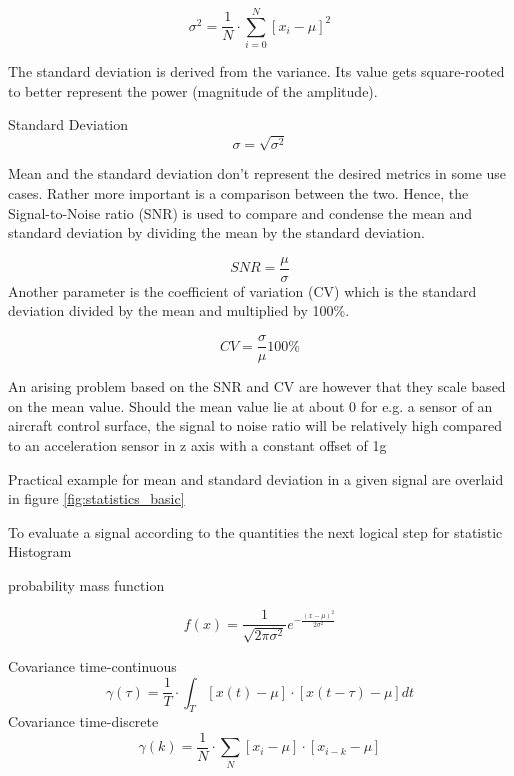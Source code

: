 \begin{equation}
    \label{eq:var_disc}
    \sigma^2=\frac{1}{N} \cdot \sum_{i=0}^{N}\left[x_i-\mu\right]^2
\end{equation}

The standard deviation is derived from the variance. Its value gets square-rooted to better represent the power (magnitude of the amplitude).

Standard Deviation
\begin{equation}
    \label{eq:stdev_disc}
    \sigma = \sqrt{\sigma^2}
\end{equation}

Mean and the standard deviation don't represent the desired metrics in some use cases. Rather more important is a comparison between the two. Hence, the Signal-to-Noise ratio (SNR) is used to compare and condense the mean and standard deviation by dividing the mean by the standard deviation.

\begin{equation}
    \label{eq:snr}
    SNR=\frac{\mu}{\sigma}
\end{equation}
Another parameter is the coefficient of variation (CV) which is the standard deviation divided by the mean and multiplied by 100\%.

\begin{equation}
    \label{eq:coeff_var}
    CV = \frac{\sigma}{\mu}100\%
\end{equation}

An arising problem based on the SNR and CV are however that they scale based on the mean value. Should the mean value lie at about 0 for e.g. a sensor of an aircraft control surface, the signal to noise ratio will be relatively high compared to an acceleration sensor in z axis with a constant offset of 1g

Practical example for mean and standard deviation in a given signal are overlaid in figure \ref{fig:statistics_basic}


To evaluate a signal according to the quantities the next logical step for statistic Histogram

probability mass function

\begin{equation}
    f(x)=\frac{1}{\sqrt{2 \pi \sigma^2}} e^{-\frac{(x-\mu)^2}{2 \sigma^2}}
\end{equation}


Covariance time-continuous
$$
\gamma(\tau)=\frac{1}{T} \cdot \int_T[x(t)-\mu] \cdot[x(t-\tau)-\mu] d t
$$
Covariance time-discrete
$$
\gamma(k)=\frac{1}{N} \cdot \sum_N\left[x_i-\mu\right] \cdot\left[x_{i-k}-\mu\right]
$$


